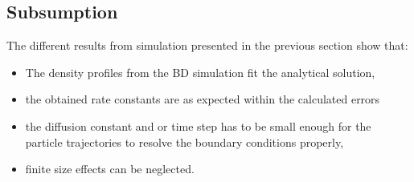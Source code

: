 \subsection{Subsumption}
The different results from simulation presented in the previous section show that:
\begin{itemize}
    \item The density profiles from the BD simulation fit the analytical solution,
    \item the obtained rate constants are as expected within the calculated errors
    \item   the diffusion constant and  or time step has to be small enough for the particle 
            trajectories to resolve the boundary conditions properly,
    \item finite size effects can be neglected.
\end{itemize}
